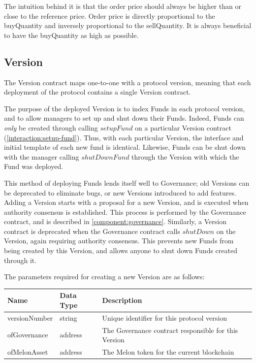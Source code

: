 \documentclass[conference]{IEEEtran}
\begin{document}
The intuition behind it is that the order price should always be higher than or close to the reference price. Order price is directly proportional to the buyQuantity and inversely proportional to the sellQuantity. It is always beneficial to have the buyQuantity as high as possible.
\subsection{Version}

The Version contract maps one-to-one with a protocol version, meaning that each deployment of the protocol contains a single Version contract.

The purpose of the deployed Version is to index Funds in each protocol version, and to allow managers to set up and shut down their Funds.
Indeed, Funds can \textit{only} be created through calling $setupFund$ on a particular Version contract (\ref{interaction:setup-fund}).
Thus, with each particular Version, the interface and initial template of each new fund is identical.
Likewise, Funds can be shut down with the manager calling $shutDownFund$ through the Version with which the Fund was deployed.

This method of deploying Funds lends itself well to Governance; old Versions can be deprecated to eliminate bugs, or new Versions introduced to add features.
Adding a Version starts with a proposal for a new Version, and is executed when authority consensus is established.
This process is performed by the Governance contract, and is described in \ref{component:governance}.
Similarly, a Version contract is deprecated when the Governance contract calls $shutDown$ on the Version, again requiring authority consensus.
This prevents new Funds from being created by this Version, and allows anyone to shut down Funds created through it.

The parameters required for creating a new Version are as follows:

\begin{center}
	\footnotesize
	\begin{tabular}{ | p{2cm} | p{1.2cm} | p{4cm} | }
		\hline
		Name & Data Type & Description \\ \hline
		versionNumber & string & Unique identifier for this protocol version \\ \hline
		ofGovernance & address & The Governance contract responsible for this Version \\ \hline
		ofMelonAsset & address & The Melon token for the current blockchain  \\ \hline
	\end{tabular}
\end{center}
\end{document}
